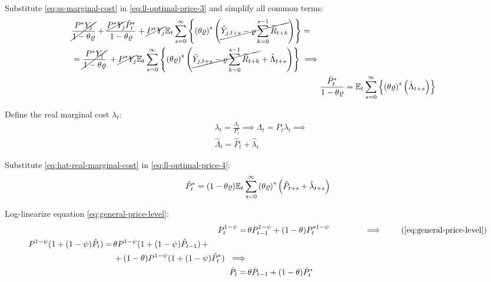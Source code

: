 \documentclass[
thesis.tex
]{subfiles}
\begin{document}
	Substitute \ref{eq:ss-marginal-cost} in \ref{eq:ll-optimal-price-3} and simplify all common terms:
	\begin{align}
		\begin{split}
			& \cancel{\frac{P^\ast Y_{j}}{1-\theta\varrho}} + \frac{ \cancel{P^\ast Y_{j}} \hat{P}_t^\ast }{1- \theta \varrho} + \cancel{P^\ast Y_{j}} {\mathbb{E}_{t}} \sum_{s=0}^{\infty} \left\{ \left( \theta \varrho \right)^s \left( \cancel{\hat{Y}_{j,t+s} - \varrho \sum_{k=0}^{s-1} \widetilde{R}_{t+k}} \right) \right\} = 
			\\
			& = \cancel{\frac{P^\ast Y_{j}}{1-\theta\varrho}} \, + \cancel{P^\ast Y_{j}} {\mathbb{E}_{t}} \sum_{s=0}^{\infty} \left\{ \left( \theta \varrho \right)^s \left( \cancel{\hat{Y}_{j,t+s} - \varrho \sum_{k=0}^{s-1} \widetilde{R}_{t+k}} + \hat{\Lambda}_{t+s} \right) \right\} \implies	
		\end{split} \nonumber \\
		& \frac{ \hat{P}_t^\ast }{1- \theta \varrho} = {\mathbb{E}_{t}} \sum_{s=0}^{\infty} \left\{ \left( \theta \varrho \right)^s \left( \hat{\Lambda}_{t+s} \right) \right\} \label{eq:ll-optimal-price-4}
	\end{align}
	
	Define the real marginal cost $\lambda_t$:
	\begin{align}
		& \lambda_t = \frac{\Lambda_t}{P_t} \implies \Lambda_t = P_t \lambda_t \implies \nonumber \\
		& \hat{\Lambda}_t = \hat{P}_t + \hat{\lambda}_t \label{eq:hat-real-marginal-cost}
	\end{align}
	
	Substitute \ref{eq:hat-real-marginal-cost} in \ref{eq:ll-optimal-price-4}:
	\begin{align}
		\hat{P}_t^\ast = (1- \theta \varrho) {\mathbb{E}_{t}} \sum_{s=0}^{\infty} \left( \theta \varrho \right)^s \left( \hat{P}_{t+s} + \hat{\lambda}_{t+s} \right) \label{eq:ll-optimal-price-5}
	\end{align}
	
	Log-linearize equation \ref{eq:general-price-level}:
	\begin{align}
		P_t^{1-\psi} =\, &\theta P_{t-1}^{1-\psi} + (1-\theta) P_t^{\ast 1-\psi} \qquad \qquad \implies \tag{\ref{eq:general-price-level}} \\
		\begin{split} P^{1-\psi} (1 + (1-\psi)\hat{P}_t) =\, &\theta P^{1-\psi} (1 + (1-\psi)\hat{P}_{t-1}) \, + \\ & + (1-\theta) P^{1-\psi} (1 + (1-\psi)\hat{P}_t^\ast) \ \implies \nonumber \end{split} \\
		\hat{P}_t =\, &\theta \hat{P}_{t-1} + (1-\theta) \hat{P}_t^\ast
		\label{eq:ll-general-price-level}
	\end{align}
	
\end{document}
